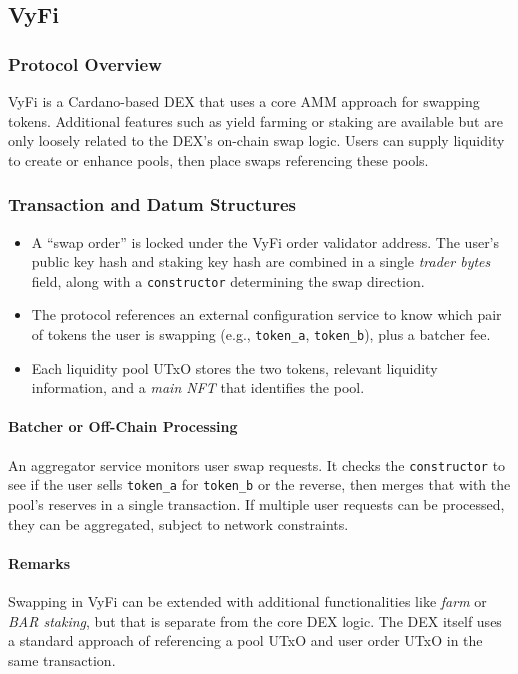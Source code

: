 \documentclass{article}
\begin{document}
\subsection{VyFi}
\label{sec:vyfi}

\subsubsection{Protocol Overview}
VyFi is a Cardano-based DEX that uses a core AMM approach for swapping tokens. Additional features such as yield farming or staking are available but are only loosely related to the DEX’s on-chain swap logic. Users can supply liquidity to create or enhance pools, then place swaps referencing these pools.

\subsubsection{Transaction and Datum Structures}
\begin{itemize}
    \item A ``swap order'' is locked under the VyFi order validator address. The user’s public key hash and staking key hash are combined in a single \emph{trader bytes} field, along with a \texttt{constructor} determining the swap direction.
    \item The protocol references an external configuration service to know which pair of tokens the user is swapping (e.g., \texttt{token\_a}, \texttt{token\_b}), plus a batcher fee.
    \item Each liquidity pool UTxO stores the two tokens, relevant liquidity information, and a \emph{main NFT} that identifies the pool.
\end{itemize}

\paragraph{Batcher or Off-Chain Processing}
An aggregator service monitors user swap requests. It checks the \texttt{constructor} to see if the user sells \texttt{token\_a} for \texttt{token\_b} or the reverse, then merges that with the pool’s reserves in a single transaction. If multiple user requests can be processed, they can be aggregated, subject to network constraints.

\paragraph{Remarks}
Swapping in VyFi can be extended with additional functionalities like \emph{farm} or \emph{BAR staking}, but that is separate from the core DEX logic. The DEX itself uses a standard approach of referencing a pool UTxO and user order UTxO in the same transaction.
\end{document}

